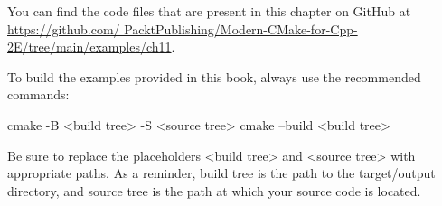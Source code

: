 You can find the code files that are present in this chapter on GitHub at \url{https://github.com/ PacktPublishing/Modern-CMake-for-Cpp-2E/tree/main/examples/ch11}.

To build the examples provided in this book, always use the recommended commands:

\begin{shell}
cmake -B <build tree> -S <source tree>
cmake --build <build tree>
\end{shell}

Be sure to replace the placeholders <build tree> and <source tree> with appropriate paths.
As a reminder, build tree is the path to the target/output directory, and source tree is the path at which your source code is located.













